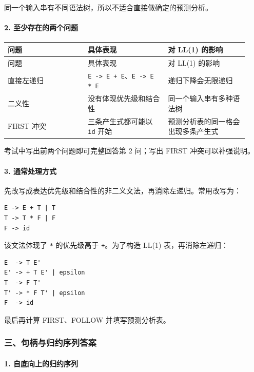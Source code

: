 \documentclass[UTF8]{ctexart}
\begin{document}
同一个输入串有不同语法树，所以不适合直接做确定的预测分析。

\paragraph*{2. 至少存在的两个问题}

\begin{longtable}{|p{0.31\linewidth}|p{0.31\linewidth}|p{0.31\linewidth}|}
\hline
问题 & 具体表现 & 对 LL(1) 的影响 \\
\hline
\endfirsthead
问题 & 具体表现 & 对 LL(1) 的影响 \\
\hline
\endhead
直接左递归 & \texttt{E -> E + E}、\texttt{E -> E * E} & 递归下降会无限递归 \\
\hline
二义性 & 没有体现优先级和结合性 & 同一个输入串有多种语法树 \\
\hline
FIRST 冲突 & 三条产生式都可能以 \texttt{id} 开始 & 预测分析表的同一格会出现多条产生式 \\
\hline
\end{longtable}

考试中写出前两个问题即可完整回答第 2 问；写出 FIRST 冲突可以补强说明。

\paragraph*{3. 通常处理方式}

先改写成表达优先级和结合性的非二义文法，再消除左递归。常用改写为：

\begin{Verbatim}[fontsize=\small,breaklines=true]
E -> E + T | T
T -> T * F | F
F -> id
\end{Verbatim}

该文法体现了 \texttt{*} 的优先级高于 \texttt{+}。为了构造 LL(1) 表，再消除左递归：

\begin{Verbatim}[fontsize=\small,breaklines=true]
E  -> T E'
E' -> + T E' | epsilon
T  -> F T'
T' -> * F T' | epsilon
F  -> id
\end{Verbatim}

最后再计算 FIRST、FOLLOW 并填写预测分析表。

\subsubsection*{三、句柄与归约序列答案}

\paragraph*{1. 自底向上的归约序列}
\end{document}
